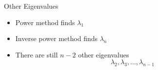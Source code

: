 \documentclass[10pt]{beamer}
\begin{document}
\begin{frame}{Other Eigenvalues}
    \begin{itemize}
        \item Power method finds $\lambda_1$
        \item Inverse power method finds $\lambda_n$
        \item There are still $n-2$ other eigenvalues 
        $$ \lambda_2, \lambda_3, \ldots, \lambda_{n-1}$$
    
    \end{itemize}
\end{frame}


\end{document}
